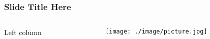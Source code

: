 \begin{frame}
\frametitle{Slide Title Here}
\begin{columns}

  \begin{column}{0.5\textwidth}
  Left column
  \end{column}

  \begin{column}{0.5\textwidth}
    \begin{figure}
      \texttt{[image: ./image/picture.jpg]}
    \end{figure}
  \end{column}

\end{columns}
\end{frame}
